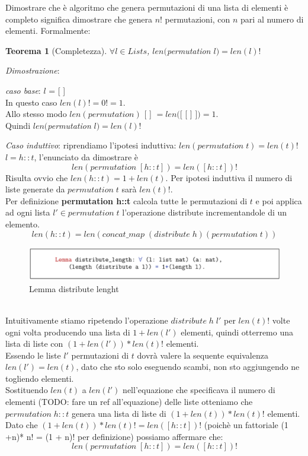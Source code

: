 \documentclass[a4paper]{article}
\newtheorem*{theorem}{Teorema}
\newenvironment{dimostrazione}{\textit{Dimostrazione}:\begin{adjustwidth}{1cm}{}}{\end{adjustwidth}}
\begin{document}
Dimostrare che è algoritmo che genera permutazioni di una lista di elementi è completo significa dimostrare che genera $n!$ permutazioni, con $n$ pari al numero di elementi. Formalmente:
\begin{theorem}[Completezza] $\forall l \in Lists$, $len($\textit{permutation} $l) = len(l)!$\end{theorem}
\begin{dimostrazione}
	\textit{caso base}: $l$ = [ ]\\
	In questo caso $len(l)! = 0! = 1$.\\
	Allo stesso modo $len(permutation)$ [ ] $= len($[ [ ] ]$) = 1$.\\
	Quindi $len($\textit{permutation} $l) = len(l)!$
	
	\textit{Caso induttivo}: riprendiamo l'ipotesi induttiva: $len(permutation \; t) = len(t)!$
	$l = h::t$, l'enunciato da dimostrare è $$len(permutation \; [h::t]) = len([h::t])!$$
	Risulta ovvio che $len(h::t) = 1 + len(t)$.
	Per ipotesi induttiva il numero di liste generate da $permutation \; t$ sarà $len(t)!$.\\
	Per definizione \textbf{permutation h::t} calcola tutte le permutazioni di $t$ e poi applica ad ogni lista $l' \in permutation \;t$ l'operazione distribute incrementandole di un elemento.
	$$len(h::t) = len(concat\_map \; (distribute \; h) (permutation \; t))$$
\begin{figure}[!ht]
\centering
\includegraphics[width=1\textwidth]{./img/A3_distribute.png}
\caption{Lemma distribute lenght} \label{FIG:A3_distribute}
\end{figure}\\
	Intuitivamente stiamo ripetendo l'operazione $distribute \; h \; l'$ per $len(t) ! $ volte ogni volta producendo una lista di $1 + len(l')$ elementi, quindi otterremo una lista di liste con $(1 + len(l')) * len(t)! $ elementi.\\
	Essendo le liste $l'$ permutazioni di $t$ dovrà valere la sequente equivalenza $len(l') = len(t) $, dato che sto solo eseguendo scambi, non sto aggiungendo ne togliendo elementi.\\
	Sostituendo $len(t)$ a $len(l')$ nell'equazione che specificava il numero di elementi (TODO: fare un ref all'equazione) delle liste otteniamo che $permutation  \; h::t$ genera una lista di liste di $(1+len(t)) * len(t)!$ elementi.\\ %
	Dato che $(1+len(t)) * len(t)! = len([h::t])!$ (poichè un fattoriale (1 +n)* n! = (1 + n)! per definizione) possiamo affermare che: 
	$$len(permutation \; [h::t]) = len([h::t])!$$
\end{dimostrazione}
\end{document}
